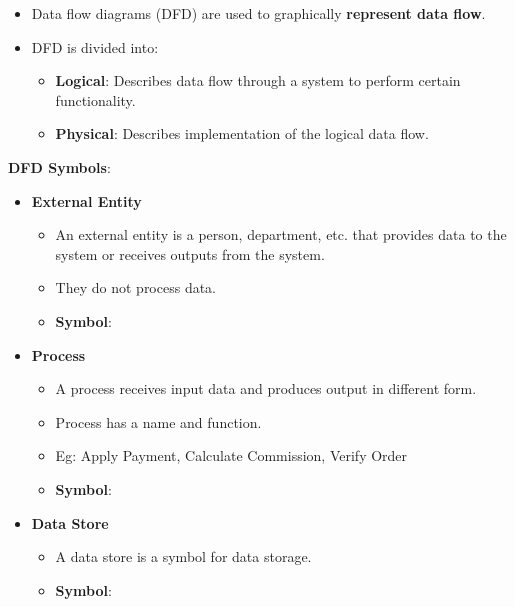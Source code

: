 
\begin{flushleft}
	
	\begin{itemize}
		\item Data flow diagrams (DFD) are used to graphically \textbf{represent data flow}. 		
		\item DFD is divided into:
		\begin{itemize}
			\item \textbf{Logical}: Describes data flow through a system to perform certain functionality. 
			\item \textbf{Physical}: Describes implementation of the logical data flow.
		\end{itemize} 
	\end{itemize}	

	\textbf{DFD Symbols}: 
	\begin{itemize}
		
		\item \textbf{External Entity}
		\begin{itemize}
			\item An external entity is a person, department, etc. that provides data to the system or receives outputs from the system. 
			\item They do not process data.
			\item \textbf{Symbol}:
		\end{itemize}
		
		\item \textbf{Process}
		\begin{itemize}
			\item A process receives input data and produces output in different form.
			\item Process has a name and function.
			\item Eg: Apply Payment, Calculate Commission, Verify Order
			\item \textbf{Symbol}:
		\end{itemize}
		\newpage
		
		\item \textbf{Data Store}
		\begin{itemize}
			\item A data store is a symbol for data storage.
			\item \textbf{Symbol}:
		\end{itemize}
		

\end{itemize}
\end{flushleft}
